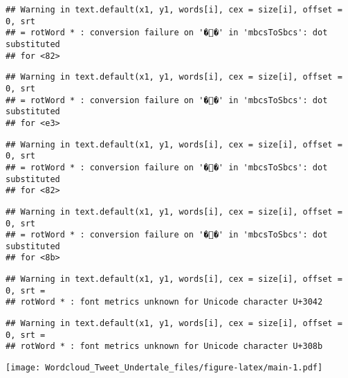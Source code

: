 \documentclass[]{article}
\begin{document}
\begin{verbatim}
## Warning in text.default(x1, y1, words[i], cex = size[i], offset = 0, srt
## = rotWord * : conversion failure on '��' in 'mbcsToSbcs': dot substituted
## for <82>
\end{verbatim}

\begin{verbatim}
## Warning in text.default(x1, y1, words[i], cex = size[i], offset = 0, srt
## = rotWord * : conversion failure on '��' in 'mbcsToSbcs': dot substituted
## for <e3>
\end{verbatim}

\begin{verbatim}
## Warning in text.default(x1, y1, words[i], cex = size[i], offset = 0, srt
## = rotWord * : conversion failure on '��' in 'mbcsToSbcs': dot substituted
## for <82>
\end{verbatim}

\begin{verbatim}
## Warning in text.default(x1, y1, words[i], cex = size[i], offset = 0, srt
## = rotWord * : conversion failure on '��' in 'mbcsToSbcs': dot substituted
## for <8b>
\end{verbatim}

\begin{verbatim}
## Warning in text.default(x1, y1, words[i], cex = size[i], offset = 0, srt =
## rotWord * : font metrics unknown for Unicode character U+3042
\end{verbatim}

\begin{verbatim}
## Warning in text.default(x1, y1, words[i], cex = size[i], offset = 0, srt =
## rotWord * : font metrics unknown for Unicode character U+308b
\end{verbatim}

\texttt{[image: Wordcloud\_Tweet\_Undertale\_files/figure-latex/main-1.pdf]}
\end{document}
